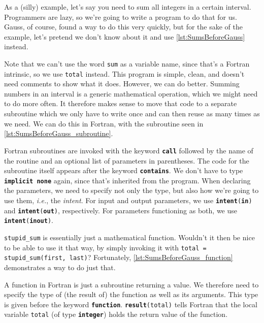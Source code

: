 \documentclass[openany,oneside]{report}
\newcommand{\keyword}[1]{\texttt{\bfseries\color{DarkBlue}#1}}
\begin{document}
As a (silly) example, let's say you need to sum all integers in a certain interval.
Programmers are lazy, so we're going to write a program to do that for us.
Gauss, of course, found a way to do this very quickly, but for the sake of the example, let's pretend we don't know about it and use \autoref{lst:SumsBeforeGauss} instead.

Note that we can't use the word \texttt{sum} as a variable name, since that's a Fortran intrinsic, so we use \texttt{total} instead.
This program is simple, clean, and doesn't need comments to show what it does.
However, we can do better.
Summing numbers in an interval is a generic mathematical operation, which we might need to do more often.
It therefore makes sense to move that code to a separate subroutine which we only have to write once and can then reuse as many times as we need.
We can do this in Fortran, with the subroutine seen in \autoref{lst:SumsBeforeGauss_subroutine}.

Fortran subroutines are invoked with the keyword \keyword{call} followed by the name of the routine and an optional list of parameters in parentheses.
The code for the subroutine itself appears after the keyword \keyword{contains}.
We don't have to type \keyword{implicit none} again, since that's inherited from the program.
When declaring the parameters, we need to specify not only the type, but also how we're going to use them, \emph{i.e.}, the \emph{intent}.
For input and output parameters, we use \texttt{\keyword{intent}(\keyword{in})} and \texttt{\keyword{intent}(\keyword{out})}, respectively.
For parameters functioning as both, we use \texttt{\keyword{intent}(\keyword{inout})}.

\texttt{stupid\_sum} is essentially just a mathematical function.
Wouldn't it then be nice to be able to use it that way, by simply invoking it with \texttt{total = stupid\_sum(first, last)}? 
Fortunately, \autoref{lst:SumsBeforeGauss_function} demonstrates a way to do just that.

A function in Fortran is just a subroutine returning a value.
We therefore need to specify the type of (the result of) the function as well as its arguments.
This type is given before the keyword \keyword{function}.
\texttt{\keyword{result}(total)} tells Fortran that the local variable \texttt{total} (of type \keyword{integer}) holds the return value of the function.
\end{document}
